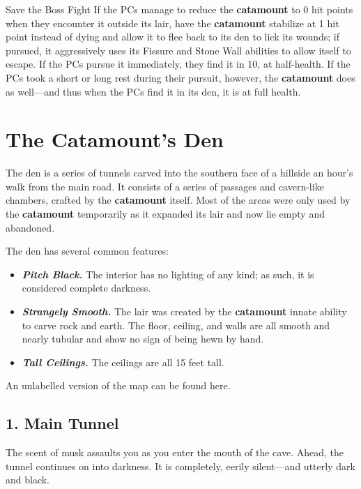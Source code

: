 \documentclass[10pt,a4paper,twoside,bg=print,twocolumn,openany,nodeprecatedcode]{dndbook}
\begin{document}
\begin{DndSidebar}[float=!b]{Save the Boss Fight}
If the PCs manage to reduce the \textbf{catamount} to 0 hit points when they encounter it outside its lair, have the \textbf{catamount} stabilize at 1 hit point instead of dying and allow it to flee back to its den to lick its wounds; if pursued, it aggressively uses its Fissure and Stone Wall abilities to allow itself to escape. If the PCs pursue it immediately, they find it in 10, at half-health. If the PCs took a short or long rest during their pursuit, however, the \textbf{catamount} does as well—and thus when the PCs find it in its den, it is at full health.



\end{DndSidebar}

\section{The Catamount's Den}
The den is a series of tunnels carved into the southern face of a hillside an hour's walk from the main road. It consists of a series of passages and cavern-like chambers, crafted by the \textbf{catamount} itself. Most of the areas were only used by the \textbf{catamount} temporarily as it expanded its lair and now lie empty and abandoned.

The den has several common features:


\begin{itemize}
\item \textbf{\textit{Pitch Black.}} The interior has no lighting of any kind; as such, it is considered complete darkness.
\item \textbf{\textit{Strangely Smooth.}} The lair was created by the \textbf{catamount} innate ability to carve rock and earth. The floor, ceiling, and walls are all smooth and nearly tubular and show no sign of being hewn by hand.
\item \textbf{\textit{Tall Ceilings.}} The ceilings are all 15 feet tall.
\end{itemize}

An unlabelled version of the map can be found here.

\subsection{1. Main Tunnel}
\begin{DndReadAloud}{}
The scent of musk assaults you as you enter the mouth of the cave. Ahead, the tunnel continues on into darkness. It is completely, eerily silent—and utterly dark and black.

\end{DndReadAloud}
\end{document}
